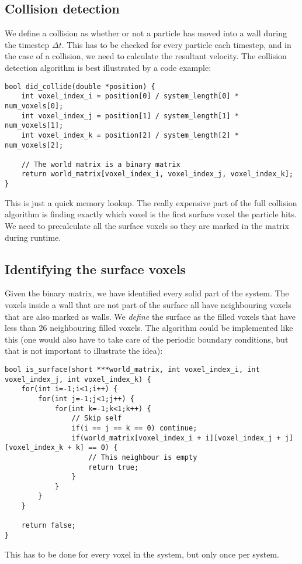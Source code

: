 \subsection{Collision detection}
We define a collision as whether or not a particle has moved into a wall during the timestep $\Delta t$. This has to be checked for every particle each timestep, and in the case of a collision, we need to calculate the resultant velocity. The collision detection algorithm is best illustrated by a code example:
\begin{lstlisting}
bool did_collide(double *position) {
	int voxel_index_i = position[0] / system_length[0] * num_voxels[0];
	int voxel_index_j = position[1] / system_length[1] * num_voxels[1];
	int voxel_index_k = position[2] / system_length[2] * num_voxels[2];

	// The world matrix is a binary matrix
	return world_matrix[voxel_index_i, voxel_index_j, voxel_index_k];
}
\end{lstlisting}
This is just a quick memory lookup. The really expensive part of the full collision algorithm is finding exactly which voxel is the first surface voxel the particle hits. We need to precalculate all the surface voxels so they are marked in the matrix during runtime.
\subsection{Identifying the surface voxels}
Given the binary matrix, we have identified every solid part of the system. The voxels inside a wall that are not part of the surface all have neighbouring voxels that are also marked as walls. We \textit{define} the surface as the filled voxels that have less than 26 neighbouring filled voxels. The algorithm could be implemented like this (one would also have to take care of the periodic boundary conditions, but that is not important to illustrate the idea):
\begin{lstlisting}
bool is_surface(short ***world_matrix, int voxel_index_i, int voxel_index_j, int voxel_index_k) {
	for(int i=-1;i<1;i++) {
    	for(int j=-1;j<1;j++) {
			for(int k=-1;k<1;k++) {
				// Skip self
				if(i == j == k == 0) continue; 
                if(world_matrix[voxel_index_i + i][voxel_index_j + j][voxel_index_k + k] == 0) {
                	// This neighbour is empty
                	return true;
                }
            }
        }
    }

    return false;
}
\end{lstlisting}
This has to be done for every voxel in the system, but only once per system. 
